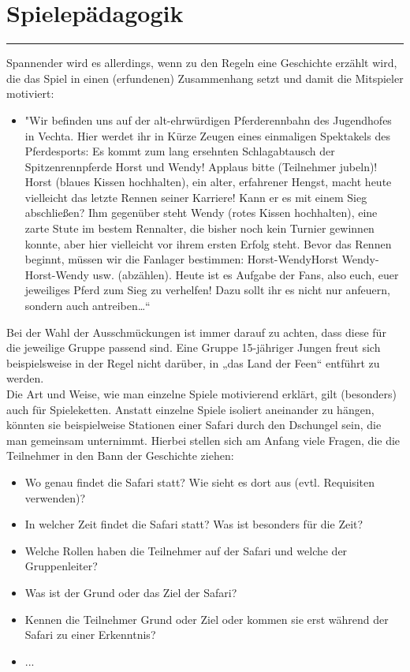\section*{Spielepädagogik}
\par\noindent\rule{\textwidth}{0.4pt} \newline \newline
Spannender wird es allerdings, wenn zu den Regeln eine Geschichte erzählt wird, die das Spiel in 
einen (erfundenen) Zusammenhang setzt und damit die Mitspieler motiviert:
\begin{itemize}
    \item[]"Wir befinden uns auf der alt-ehrwürdigen Pferderennbahn des Jugendhofes in 
Vechta. Hier werdet ihr in Kürze Zeugen eines einmaligen Spektakels des 
Pferdesports: Es kommt zum lang ersehnten Schlagabtausch der Spitzenrennpferde 
Horst und Wendy! Applaus bitte (Teilnehmer jubeln)! Horst (blaues Kissen 
hochhalten), ein alter, erfahrener Hengst, macht heute vielleicht das letzte Rennen 
seiner Karriere! Kann er es mit einem Sieg abschließen? Ihm gegenüber steht Wendy 
(rotes Kissen hochhalten), eine zarte Stute im bestem Rennalter, die bisher noch kein 
Turnier gewinnen konnte, aber hier vielleicht vor ihrem ersten Erfolg steht. Bevor 
das Rennen beginnt, müssen wir die Fanlager bestimmen: Horst-WendyHorst Wendy-Horst-Wendy usw. (abzählen). Heute ist es Aufgabe der Fans, also euch, euer 
jeweiliges Pferd zum Sieg zu verhelfen! Dazu sollt ihr es nicht nur anfeuern, sondern 
auch antreiben…“
\end{itemize}

Bei der Wahl der Ausschmückungen ist immer darauf zu achten, dass diese für die jeweilige 
Gruppe passend sind. Eine Gruppe 15-jähriger Jungen freut sich beispielsweise in der Regel nicht 
darüber, in „das Land der Feen“ entführt zu werden. \\

Die Art und Weise, wie man einzelne Spiele motivierend erklärt, gilt (besonders) auch für 
Spieleketten. Anstatt einzelne Spiele isoliert aneinander zu hängen, könnten sie beispielweise 
Stationen einer Safari durch den Dschungel sein, die man gemeinsam unternimmt. Hierbei stellen 
sich am Anfang viele Fragen, die die Teilnehmer in den Bann der Geschichte ziehen:

\begin{itemize}
    \item Wo genau findet die Safari statt? Wie sieht es dort aus (evtl. Requisiten verwenden)? 
    \item In welcher Zeit findet die Safari statt? Was ist besonders für die Zeit? 
    \item Welche Rollen haben die Teilnehmer auf der Safari und welche der Gruppenleiter?
    \item Was ist der Grund oder das Ziel der Safari? 
    \item Kennen die Teilnehmer Grund oder Ziel oder kommen sie erst während der Safari zu einer Erkenntnis?
    \item ...
\end{itemize}

